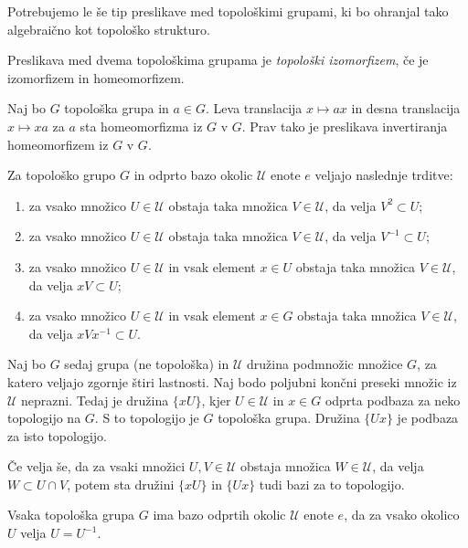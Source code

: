 \documentclass[mat1]{fmfdelo}
\newcommand{\Ucurl}{\mathcal{U}}
\begin{document}
Potrebujemo le še tip preslikave med topološkimi grupami, ki bo ohranjal tako algebraično kot topološko strukturo.
\begin{definicija}\label{def:topizo}
Preslikava med dvema topološkima grupama je \emph{topološki izomorfizem}, če je izomorfizem in homeomorfizem.
\end{definicija}


\begin{trditev}\label{trd:trans}
Naj bo $G$ topološka grupa in $a \in G$. Leva translacija $x \mapsto ax$ in desna translacija $x \mapsto xa$ za $a$ sta homeomorfizma iz $G$ v $G$. Prav tako je preslikava invertiranja homeomorfizem iz $G$ v $G$.
\end{trditev}

\begin{trditev}\label{trd:okolice}
Za topološko grupo $G$ in odprto bazo okolic $\Ucurl$ enote $e$ veljajo naslednje trditve:
\begin{enumerate}
\item za vsako množico $U \in \Ucurl$ obstaja taka množica $V \in \Ucurl$, da velja $V^{2} \subset U$;
\item za vsako množico $U \in \Ucurl$ obstaja taka množica $V \in \Ucurl$, da velja $V^{-1} \subset U$;
\item za vsako množico $U \in \Ucurl$ in vsak element $x \in U$ obstaja taka množica $V \in \Ucurl$, da velja $xV \subset U$;
\item za vsako množico $U \in \Ucurl$ in vsak element $x \in G$ obstaja taka množica $V \in \Ucurl$, da velja $xVx^{-1} \subset U$.
\end{enumerate}

Naj bo $G$ sedaj grupa (ne topološka) in $\Ucurl$ družina podmnožic množice $G$, za katero veljajo zgornje štiri lastnosti. Naj bodo poljubni končni preseki množic iz $\Ucurl$ neprazni. Tedaj je družina $\lbrace xU \rbrace$, kjer $U \in \Ucurl$ in $x \in G$ odprta podbaza za neko topologijo na $G$. S to topologijo je $G$ topološka grupa. Družina $\lbrace Ux \rbrace$ je podbaza za isto topologijo.

Če velja še, da za vsaki množici $U,V \in \Ucurl$ obstaja množica $W \in \Ucurl$, da velja $W \subset U \cap V$, potem sta družini $\lbrace xU \rbrace$ in $\lbrace Ux \rbrace$ tudi bazi za to topologijo.
\end{trditev}

\begin{trditev}\label{trd:sim}
Vsaka topološka grupa $G$ ima bazo odprtih okolic $\Ucurl$ enote $e$, da za vsako okolico $U$ velja $U = U^{-1}$.
\end{trditev}
\end{document}
